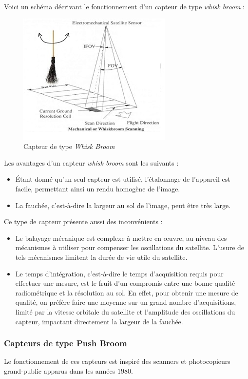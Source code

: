 \documentclass[a4paper, 11pt]{report}
\begin{document}
Voici un schéma décrivant le fonctionnement d'un capteur de type \emph{whisk broom} :
\begin{figure}[H]
	\begin{center}
		\includegraphics[scale=1.]{Images/Whisk_Broom.jpg}
		\caption{Capteur de type \emph{Whisk Broom}}
	\end{center}
\end{figure}
Les avantages d'un capteur \emph{whisk broom} sont les suivants :
\begin{itemize}
	\item Étant donné qu'un seul capteur est utilisé, l'étalonnage de l'appareil est facile, permettant ainsi un rendu homogène de l'image.
	\item La fauchée, c'est-à-dire la largeur au sol de l'image, peut être très large.
\end{itemize}
Ce type de capteur présente aussi des inconvénients :
\begin{itemize}
	\item Le balayage mécanique est complexe à mettre en œuvre, au niveau des mécanismes à utiliser pour compenser les oscillations du satellite. L'usure de tels mécanismes limitent la durée de vie utile du satellite.
	\item Le temps d'intégration, c'est-à-dire le temps d'acquisition requis pour effectuer une mesure, est le fruit d'un compromis entre une bonne qualité radiométrique et la résolution au sol. En effet, pour obtenir une mesure de qualité, on préfère faire une moyenne sur un grand nombre d'acquisitions, limité par la vitesse orbitale du satellite et l'amplitude des oscillations du capteur, impactant directement la largeur de la fauchée.
\end{itemize}
\subsubsection{Capteurs de type Push Broom}
Le fonctionnement de ces capteurs est inspiré des scanners et photocopieurs grand-public apparus dans les années $1980$.
\end{document}
